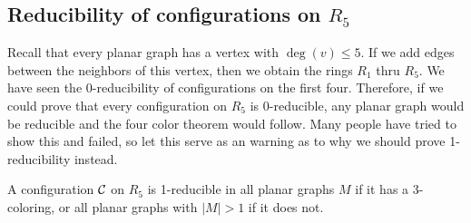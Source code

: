 \subsection{Reducibility of configurations on $R_5$}

Recall that every planar graph has a vertex with $\deg(v) \leq 5$. If we add edges between the neighbors of this vertex, then we obtain the rings $R_1$ thru $R_5$. We have seen the 0-reducibility of configurations on the first four. Therefore, if we could prove that every configuration on $R_5$ is 0-reducible, any planar graph would be reducible and the four color theorem would follow. Many people have tried to show this and failed, so let this serve as an warning as to why we should prove 1-reducibility instead.

\begin{theorem}
    A configuration $\mathcal{C}$ on $R_5$ is 1-reducible in all planar graphs $M$ if it has a 3-coloring, or all planar graphs with $|M|>1$ if it does not.
\end{theorem}

